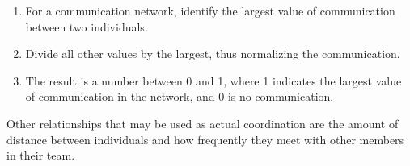 \begin{enumerate}
\item For a communication network, identify the largest value of communication between two individuals.
\item Divide all other values by the largest, thus normalizing the communication.
\item The result is a number between 0 and 1, where 1 indicates the largest value of communication in the network, and 0 is no communication.
\end{enumerate}

Other relationships that may be used as actual coordination are the amount of distance between individuals and how frequently they meet with other members in their team.






